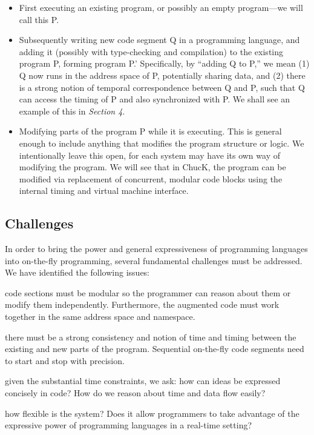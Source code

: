 \begin{itemize}
	\item First executing an existing program, or possibly an empty program---we will call this P.
	\item Subsequently writing new code segment Q in a programming language, and adding it (possibly with type-checking and compilation) to the existing program P, forming program P.'  Specifically, by ``adding Q to P,'' we mean (1) Q now runs in the address space of P, potentially sharing data, and (2) there is a strong notion of temporal correspondence between Q and P, such that Q can access the timing of P and also synchronized with P.  We shall see an example of this in \textit{Section 4}.
	\item Modifying parts of the program P while it is executing.  This is general enough to include anything that modifies the program structure or logic.  We intentionally leave this open, for each system may have its own way of modifying the program.  We will see that in ChucK, the program can be modified via replacement of concurrent, modular code blocks using the internal timing and virtual machine interface.
\end{itemize}

\subsection{Challenges}

In order to bring the power and general expressiveness of programming languages
into on-the-fly programming, several fundamental challenges must be addressed. 
We have identified the following issues:

\begin{description}[Type 1]
	\item[Modularity:]{code sections must be modular so the programmer can reason about them or modify them independently.  Furthermore, the augmented code must work together in the same address space and namespace.}
	\item[Timing:]{there must be a strong consistency and notion of time and timing between the existing and new parts of the program.  Sequential on-the-fly code segments need to start and stop with precision.}
	\item[Conciseness and manageability:]{given the substantial time constraints, we ask: how can ideas be expressed concisely in code?   How do we reason about time and data flow easily?}
	\item[Flexibility:]{how flexible is the system?  Does it allow programmers to take advantage of the expressive power of programming languages in a real-time setting?}
\end{description}

